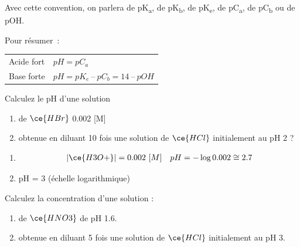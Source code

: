 \documentclass[
  11pt,
  french,
  a4paper,
  openany]{book}
\providecommand{\tightlist}{%
  \setlength{\itemsep}{0pt}\setlength{\parskip}{0pt}}
\begin{document}
Avec cette convention, on parlera de pK\textsubscript{a}, de pK\textsubscript{b}, de pK\textsubscript{e}, de pC\textsubscript{a}, de pC\textsubscript{b} ou de pOH.

Pour résumer~:

\begin{longtable}[]{@{}ll@{}}
\toprule
\endhead
Acide fort & \(pH = pC_a\)\tabularnewline
Base forte & \(pH = pK_e\ –\ pC_b = 14\ –\ pOH\)\tabularnewline
\bottomrule
\end{longtable}

\begin{Exercise}

Calculez le pH d'une solution

\begin{enumerate}
\def\labelenumi{\alph{enumi}.}
\tightlist
\item
  de \(\ce{HBr}\) 0.002 {[}M{]}
\item
  obtenue en diluant 10 fois une solution de \(\ce{HCl}\) initialement au pH 2 ?
\end{enumerate}


\end{Exercise}

\begin{Answer}

\begin{enumerate}
\def\labelenumi{\alph{enumi}.}
\tightlist
\item
  \[
  \begin{split}
  |\ce{H3O+}| = 0.002\ [M]
  \end{split}
  \quad
  \begin{split}
  pH = - \log 0.002 \cong 2.7
  \end{split}
  \]
\item
  pH = 3 (échelle logarithmique)
\end{enumerate}


\end{Answer}

\clearpage

\begin{Exercise}

Calculez la concentration d'une solution :

\begin{enumerate}
\def\labelenumi{\alph{enumi}.}
\tightlist
\item
  de \(\ce{HNO3}\) de pH 1.6.
\item
  obtenue en diluant 5 fois une solution de \(\ce{HCl}\) initialement au pH 3.
\end{enumerate}


\end{Exercise}
\end{document}
